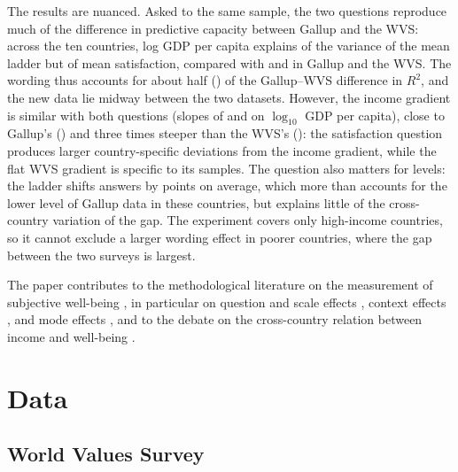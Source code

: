 \documentclass[12pt]{article}
\begin{document}
The results are nuanced. Asked to the same sample, the two questions reproduce much of the difference in predictive capacity between Gallup and the WVS: across the ten countries, log GDP per capita explains \RtwoTenFabreLadderPooled of the variance of the mean ladder but \RtwoTenFabreSatisfactionPooled of mean satisfaction, compared with \RtwoTenGallup and \RtwoTenWVS in Gallup and the WVS. The wording thus accounts for about half (\decompShareRWordingPooled) of the Gallup--WVS difference in $R^2$, and the new data lie midway between the two datasets. However, the income gradient is similar with both questions (slopes of \slopeTenFabreLadderPooled and \slopeTenFabreSatisfactionPooled on $\log_{10}$ GDP per capita), close to Gallup's (\slopeTenGallup) and three times steeper than the WVS's (\slopeTenWVS): the satisfaction question produces larger country-specific deviations from the income gradient, while the flat WVS gradient is specific to its samples. The question also matters for levels: the ladder shifts answers by \effectLadder points on average, which more than accounts for the lower level of Gallup data in these countries, but explains little of the cross-country variation of the gap. The experiment covers only high-income countries, so it cannot exclude a larger wording effect in poorer countries, where the gap between the two surveys is largest.

The paper contributes to the methodological literature on the measurement of subjective well-being \citep{kahneman_developments_2006,oecd_guidelines_2013,stone_subjective_2013,kaiser_scientific_2022}, in particular on question and scale effects \citep{conti_survey_2011,bond_sad_2019}, context effects \citep{deaton_financial_2012,deaton_understanding_2016}, and mode effects \citep{dolan_happy_2016}, and to the debate on the cross-country relation between income and well-being \citep{deaton_income_2008,stevenson_economic_2008,sacks_new_2012}.

\section{Data}\label{sec:data}
\subsection{World Values Survey}\label{subsec:wvs}
\end{document}
